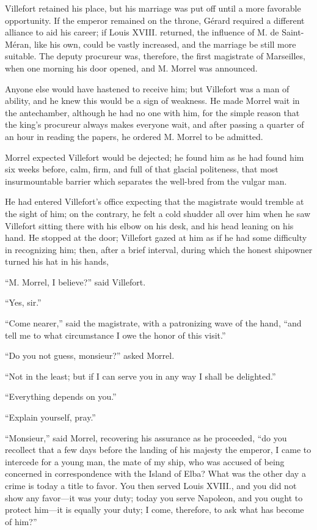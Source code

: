 Villefort retained his place, but his marriage was put off until a more
favorable opportunity. If the emperor remained on the throne, Gérard
required a different alliance to aid his career; if Louis XVIII.
returned, the influence of M. de Saint-Méran, like his own, could be
vastly increased, and the marriage be still more suitable. The deputy
procureur was, therefore, the first magistrate of Marseilles, when one
morning his door opened, and M. Morrel was announced.

Anyone else would have hastened to receive him; but Villefort was a man
of ability, and he knew this would be a sign of weakness. He made
Morrel wait in the antechamber, although he had no one with him, for
the simple reason that the king’s procureur always makes everyone wait,
and after passing a quarter of an hour in reading the papers, he
ordered M. Morrel to be admitted.

Morrel expected Villefort would be dejected; he found him as he had
found him six weeks before, calm, firm, and full of that glacial
politeness, that most insurmountable barrier which separates the
well-bred from the vulgar man.

He had entered Villefort’s office expecting that the magistrate would
tremble at the sight of him; on the contrary, he felt a cold shudder
all over him when he saw Villefort sitting there with his elbow on his
desk, and his head leaning on his hand. He stopped at the door;
Villefort gazed at him as if he had some difficulty in recognizing him;
then, after a brief interval, during which the honest shipowner turned
his hat in his hands,

“M. Morrel, I believe?” said Villefort.

“Yes, sir.”

“Come nearer,” said the magistrate, with a patronizing wave of the
hand, “and tell me to what circumstance I owe the honor of this visit.”

“Do you not guess, monsieur?” asked Morrel.

“Not in the least; but if I can serve you in any way I shall be
delighted.”

“Everything depends on you.”

“Explain yourself, pray.”

“Monsieur,” said Morrel, recovering his assurance as he proceeded, “do
you recollect that a few days before the landing of his majesty the
emperor, I came to intercede for a young man, the mate of my ship, who
was accused of being concerned in correspondence with the Island of
Elba? What was the other day a crime is today a title to favor. You
then served Louis XVIII., and you did not show any favor—it was your
duty; today you serve Napoleon, and you ought to protect him—it is
equally your duty; I come, therefore, to ask what has become of him?”

